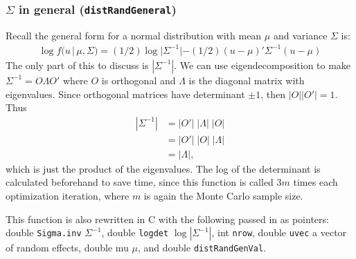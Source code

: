 \documentclass{article}
\begin{document}
\subsubsection{$\Sigma$ in general (\texttt{distRandGeneral})}\label{sec:Dgeneral}
 Recall the general form for a normal distribution with mean $\mu$ and variance $\Sigma$ is:
\begin{align}
\log f(u \,| \,\mu, \Sigma) = (1/2) \log |\Sigma^{-1}| - (1/2) (u-\mu)' \Sigma^{-1} (u-\mu)
\end{align}
 The only part of this to discuss is $|\Sigma^{-1}|$. We can use eigendecomposition to make $\Sigma^{-1}=O \Lambda O'$ where $O$ is orthogonal and $\Lambda$ is the diagonal matrix with eigenvalues. Since orthogonal matrices have determinant $\pm 1$, then $|O||O'|=1$. Thus  
\begin{align}
|\Sigma^{-1}|&=|O'| \; |\Lambda| \; |O| \\
&= |O'| \; |O| \; |\Lambda| \\
&=|\Lambda|,
\end{align}
which is just the product of the eigenvalues. The log of the determinant is calculated beforehand to save time, since this function is called $3m$ times each optimization iteration, where $m$ is again the Monte Carlo sample size.

This function is also rewritten in C with the following  passed in as pointers: double \texttt{Sigma.inv} $\Sigma^{-1}$, double \texttt{logdet} $\log |\Sigma^{-1}|$, int \texttt{nrow}, double \texttt{uvec} a vector of random effects, double {mu} $\mu$, and double \texttt{distRandGenVal}.

%
\end{document}
